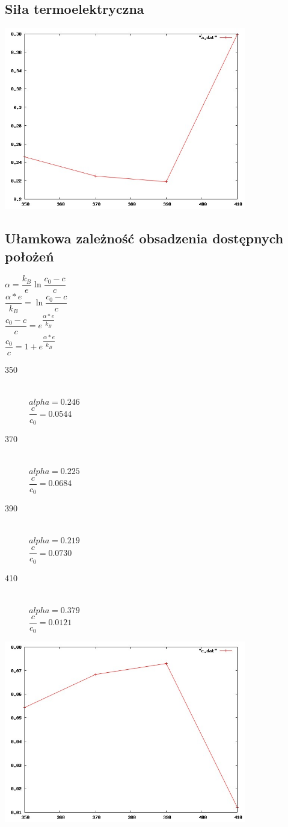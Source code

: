 \documentclass[a4paper,12pt]{article}
\begin{document}
\subsection{Siła termoelektryczna}
\begin{center}
\includegraphics[width=400px]{a}
\end{center}
\subsection{Ułamkowa zależność obsadzenia dostępnych położeń}
$\alpha=\dfrac{k_B}{e}\ln\dfrac{c_0-c}{c}$\\
$\dfrac{\alpha* e}{k_B}=\ln\dfrac{c_0-c}{c}$\\
$\dfrac{c_0-c}{c}=e^{\dfrac{\alpha * e}{k_B}}$\\
$\dfrac{c_0}{c}=1+e^{\dfrac{\alpha * e}{k_B}}$\\
\begin{description}
\item[350]\hfill \\
$alpha=0.246$\\
$\dfrac{c}{c_0}=0.0544$
\item[370]\hfill \\
$alpha=0.225$\\
$\dfrac{c}{c_0}=0.0684$
\item[390]\hfill \\
$alpha=0.219$\\
$\dfrac{c}{c_0}=0.0730$
\item[410]\hfill \\
$alpha=0.379$\\
$\dfrac{c}{c_0}=0.0121$
\end{description}
\begin{center}
\includegraphics[width=400px]{c}
\end{center}
\end{document}
